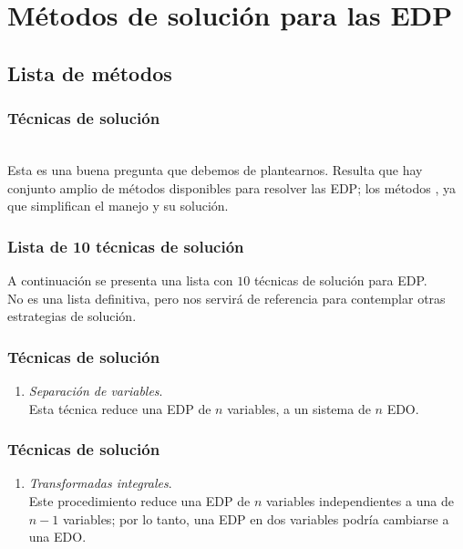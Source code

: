 \documentclass[12pt]{beamer}
\begin{document}
\section{Métodos de solución para las EDP}
\subsection{Lista de métodos}

\begin{frame}
\frametitle{Técnicas de solución}
\\
\bigskip
\pause
Esta es una buena pregunta que debemos de plantearnos. Resulta que hay conjunto amplio de métodos disponibles para resolver las EDP; los métodos , ya que simplifican el manejo y su solución.
\end{frame}
\begin{frame}
\frametitle{Lista de 10 técnicas de solución}
A continuación se presenta una lista con $10$ técnicas de solución para EDP.
\\
\bigskip
\pause
No es una lista definitiva, pero nos servirá de referencia para contemplar otras estrategias de solución.
\end{frame}
\begin{frame}
\frametitle{Técnicas de solución}
\begin{enumerate}
\item \emph{Separación de variables}.
\\
\bigskip
Esta técnica reduce una EDP de $n$ variables, a un sistema de $n$ EDO.
\seti
\end{enumerate}
\end{frame}
\begin{frame}
\frametitle{Técnicas de solución}
\begin{enumerate}
\conti
\item \emph{Transformadas integrales}. 
\\
\bigskip
Este procedimiento reduce una EDP de $n$ variables independientes a una de $n - 1$ variables; por lo tanto, una EDP en dos variables podría cambiarse a una EDO.
\seti
\end{enumerate}
\end{frame}
\end{document}
